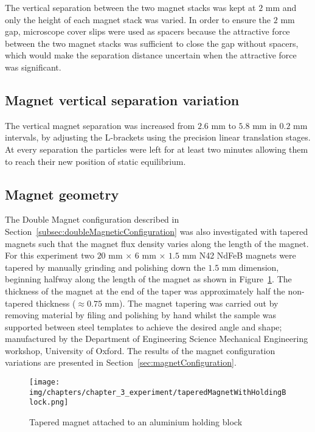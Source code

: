 The vertical separation between the two magnet stacks was kept at $2$ mm and only the height of each magnet stack was varied. In order to ensure the $2$ mm gap, microscope cover slips were used as spacers because the attractive force between the two magnet stacks was sufficient to close the gap without spacers, which would make the separation distance uncertain when the attractive force was significant.

\subsection{Magnet vertical separation variation}\label{subsec:magnetVerticalSeparationVariation}
The vertical magnet separation was increased from $2.6$ mm to $5.8$ mm in $0.2$ mm intervals, by adjusting the L-brackets using the precision linear translation stages. At every separation the particles were left for at least two minutes allowing them to reach their new position of static equilibrium. 

\subsection{Magnet geometry}\label{subsec:taperedMagnets}
The Double Magnet configuration described in Section~\ref{subsec:doubleMagneticConfiguration} was also investigated with tapered magnets such that the magnet flux density varies along the length of the magnet. For this experiment two $20$ mm $\times$ $6$ mm $\times$ $1.5$ mm N42 NdFeB magnets were tapered by manually grinding and polishing down the $1.5$ mm dimension, beginning halfway along the length of the magnet as shown in Figure~\ref{fig:taperedMagnetWithHoldingBlock}. The thickness of the magnet at the end of the taper was approximately half the non-tapered thickness ($\approx 0.75$ mm). The magnet tapering was carried out by removing material by filing and polishing by hand whilst the sample was supported between steel templates to achieve the desired angle and shape; manufactured by the Department of Engineering Science Mechanical Engineering workshop, University of Oxford. The results of the magnet configuration variations are presented in Section~\ref{sec:magnetConfiguration}.

\begin{figure}[htb]
	\centering
	\texttt{[image: img/chapters/chapter\_3\_experiment/taperedMagnetWithHoldingBlock.png]}
	\caption[Tapered magnet attached to holding block]{Tapered magnet attached to an aluminium holding block}
	\label{fig:taperedMagnetWithHoldingBlock}
\end{figure}

